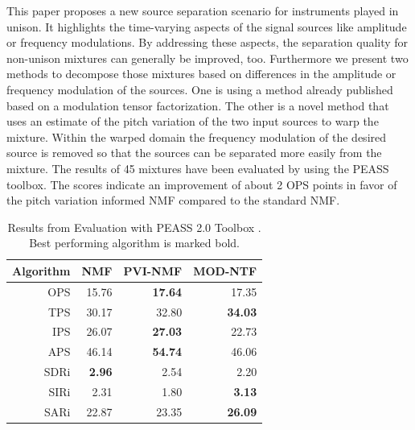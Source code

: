 This paper proposes a new source separation scenario for instruments played in unison. It highlights the time-varying aspects of the signal sources like amplitude or frequency modulations. By addressing these aspects, the separation quality for non-unison mixtures can generally be improved, too.
Furthermore we present two methods to decompose those mixtures based on differences in the amplitude or frequency modulation of the sources. One is using a method already published based on a modulation tensor factorization. The other is a novel method that uses an estimate of the pitch variation of the two input sources to warp the mixture. Within the warped domain the frequency modulation of the desired source is removed so that the sources can be separated more easily from the mixture. The results of 45 mixtures have been evaluated by using the PEASS toolbox. The scores indicate an improvement of about 2 OPS points in favor of the pitch variation informed NMF compared to the standard NMF.

\begin{table}
\begin{center}
\small
\begin{tabular}{ r | r r r }
  Algorithm & NMF & PVI-NMF & MOD-NTF \\
  \hline
  OPS & 15.76 & \textbf{17.64} & 17.35 \\
  TPS & 30.17 & 32.80 & \textbf{34.03} \\
  IPS & 26.07 & \textbf{27.03} & 22.73 \\
  APS & 46.14 & \textbf{54.74} & 46.06 \\
  \hline
  SDRi & \textbf{2.96} & 2.54 & 2.20 \\
  SIRi & 2.31 & 1.80 & \textbf{3.13} \\
  SARi & 22.87 & 23.35 & \textbf{26.09} \\
\end{tabular}
\end{center}
  \caption{Results from Evaluation with PEASS 2.0 Toolbox \cite{emiya11}. Best performing algorithm is marked bold.}
  \label{tab:results}
\end{table}


